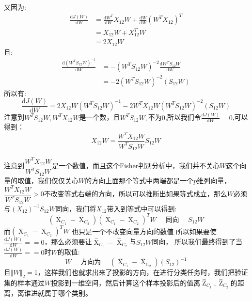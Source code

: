 \documentclass[withoutpreface,bwprint]{cumcmthesis} %
\begin{document}
	又因为:
	\begin{align*}
		\frac{\mathrm{d} J(W)}{\mathrm{d} W} &=\frac{\mathrm{d} W^T}{\mathrm{d} W}X_{12}W+ \frac{\mathrm{d} W}{\mathrm{d} W}\left( W^TX_{12}\right)^T\\
		&=X_{12}W+X_{12}^TW\\
		&=2X_{12}W
	\end{align*}
	且:
	\begin{align*}
		 \frac{\mathrm{d} \left(W^TS_{12}W\right)^{-1}}{\mathrm{d} W}& =-\left(W^TS_{12}W\right)^{-2}\frac{\mathrm{d} W^TS_{12}W}{\mathrm{d} W}\\
		 															&=-2\left(W^TS_{12}W\right)^{-2}\left( S_{12}W \right)
	\end{align*}
	所以有:
	\begin{equation}
		\frac{\mathrm{d} J(W)}{\mathrm{d} W}=2X_{12}W\left(W^TS_{12}W\right)^{-1}-2 W^TX_{12}W\left(W^TS_{12}W\right)^{-2}\left( S_{12}W \right)
	\end{equation}
	注意到$W^TS_{12}W, W^TX_{12}W$是一个数，且$W^TS_{12}W,$不为$0$,所以我们令$	\frac{\mathrm{d} J(W)}{\mathrm{d} W}=0$,可以得到：
	\begin{equation*}
		X_{12}W=\dfrac{W^TX_{12}W}{W^TS_{12}W}S_{12}W		
	\end{equation*}

	注意到$\dfrac{W^TX_{12}W}{W^TS_{12}W} $是一个数值，而且这个Fisher判别分析中，我们并不关心$W$这个向量的取值，我们仅仅关心$W$的方向上面那个等式中两端都是一个$p$维列向量，$\dfrac{W^TX_{12}W}{W^TS_{12}W}>0$不改变等式右端的方向，所以可以推断出如果等式成立，那么$W$必须与$\left( X_{12}\right)^{-1}S_{12}W$同向，我们将$X_{12}$带入到等式中可以得到:
	\begin{equation}
		\left({\mathop{X}\limits^{-}}_{C_1}-{\mathop{X}\limits^{-}}_{C_2} \right)\left({\mathop{X}\limits^{-}}_{C_1}-{\mathop{X}\limits^{-}}_{C_2} \right)^T W  \quad \textbf{ 同向 } \quad S_{12} W
	\end{equation}
	而$\left({\mathop{X}\limits^{-}}_{C_1}-{\mathop{X}\limits^{-}}_{C_2} \right)^T W$ 也只是一个不改变向量方向的数值
	所以如果要使$\frac{\mathrm{d} J(W)}{\mathrm{d} W}==0$，那么必须要让${\mathop{X}\limits^{-}}_{C_1}-{\mathop{X}\limits^{-}}_{C_2}$与$S_{12} W$同向，
	所以我们最终得到了当$\frac{\mathrm{d} J(W)}{\mathrm{d} W}==0$时$W$的取值:
	\begin{equation}
		W \quad \textbf{ 方向为 } \quad  \left( {\mathop{X}\limits^{-}}_{C_1}-{\mathop{X}\limits^{-}}_{C_2}\right) \left( S_{12}\right)^{-1}
	\end{equation}
	且$\Vert W \Vert_2=1$，这样我们也就求出来了投影的方向，在进行分类任务时，我们把验证集的样本通过$W$投影到一维空间，然后计算这个样本投影后的值离${\mathop{Z}\limits^{-}}_{C_1},{\mathop{Z}\limits^{-}}_{C_2}$的距离，离谁进就属于哪个类别。
\end{document}
